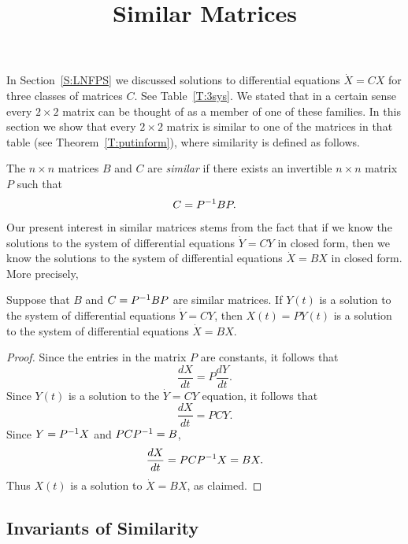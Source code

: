 \documentclass{ximera}
\title{Similar Matrices}
\begin{document}
\begin{abstract}
\end{abstract}
\maketitle

 \label{S:6.5}

In Section~\ref{S:LNFPS} we discussed solutions to differential equations
$\dot{X}=CX$ for three classes of matrices $C$.  See Table~\ref{T:3sys}.
We stated that in a certain sense every $2\times 2$ matrix can be
thought of as a member of one of these families.  In this section we
show that every $2\times 2$ matrix is similar to one of the matrices in that
table (see Theorem~\ref{T:putinform}), where similarity is defined as follows.

\begin{Def}  \label{D:similar}
The $n\times n$ matrices $B$ and $C$ are {\em similar\/} if
there exists an invertible $n\times n$ matrix $P$ such that
\[
C = P^{-1} BP.
\]
\end{Def}  

Our present interest in similar matrices stems from the fact that if we
know the solutions to the system of differential equations $\dot{Y}=CY$ in
closed form, then we know the solutions to the system of differential
equations $\dot{X}=BX$ in closed form.  More precisely,
\begin{lemma}  \label{L:simsoln}
Suppose that $B$ and $C=P^{-1} BP$ are similar matrices.  If
$Y(t)$ is a solution to the system of differential equations
$\dot{Y}=CY$, then $X(t)=PY(t)$ is a solution to the system of 
differential equations $\dot{X}=BX$.
\end{lemma}

\begin{proof}   Since the entries in the matrix $P$ are constants, it follows that
\[
\frac{dX}{dt} = P\frac{dY}{dt}.
\]
Since $Y(t)$ is a solution to the $\dot{Y}=CY$ equation, it follows that
\[
\frac{dX}{dt} = PCY.
\]
Since $Y=P^{-1} X$ and $PCP^{-1} = B$,
\[
\frac{dX}{dt} = PCP^{-1} X = BX.
\]
Thus $X(t)$ is a solution to $\dot{X}=BX$, as claimed.  \end{proof}


\subsection*{Invariants of Similarity}
\end{document}
